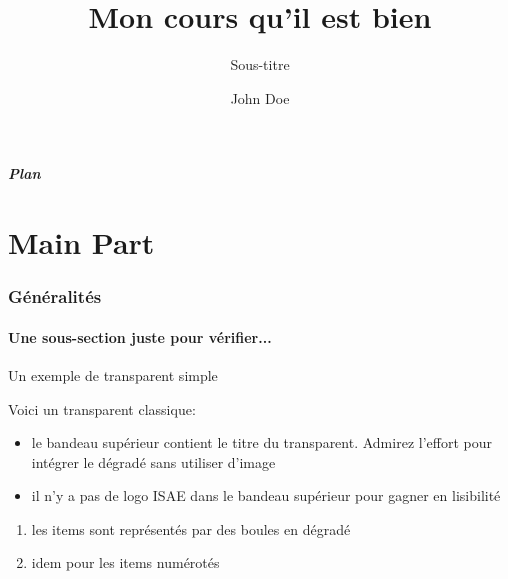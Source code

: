 \documentclass{beamer}
\begin{document}
\title[Petit titre]{Mon cours qu'il est bien}
\subtitle{Sous-titre}
\author{John Doe}
\subject{Slides to present my beamer class for ISAE slides.}
\date{}

\begin{frame}
  \titlepage
\end{frame}

\begin{frame}
\frametitle{Plan}
\tableofcontents[part=1,pausesections]
\end{frame}


\part<presentation>{Main Part}

\section{Généralités}
\label{sec:gen}

\subsection{Une sous-section juste pour vérifier...}
\label{sec:sub}

\begin{frame}{Un exemple de transparent simple}

\vfill

Voici un transparent classique:

\begin{itemize}
\item le bandeau supérieur contient le titre du transparent. Admirez
  l'effort pour intégrer le dégradé sans utiliser d'image \smiley
\item il n'y a pas de logo ISAE dans le bandeau supérieur pour gagner
  en lisibilité
\end{itemize}

\begin{enumerate}
\item les items sont représentés par des boules en dégradé
\item idem pour les items numérotés
\end{enumerate}

\vfill

\end{frame}
\end{document}
